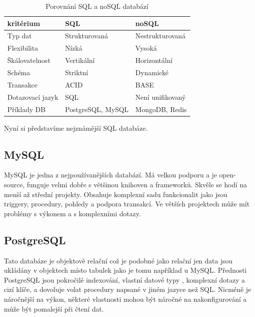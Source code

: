\begin{table}
    \centering
    \begin{tabular}{|l|l|l|}
        \hline
        kritérium        & SQL               & noSQL            \\
        \hline
        Typ dat          & Strukturovaná     & Nestrukturovaná  \\
        Flexibilita      & Nízká             & Vysoká           \\
        Škálovatelnost   & Vertikální        & Horizontální     \\
        Schéma           & Striktní          & Dynamické        \\
        Transakce        & ACID              & BASE             \\
        Dotazovací jazyk & SQL               & Není unifikovaný \\
        Příklady DB      & PostgreSQL, MySQL & MongoDB, Redis   \\
    \end{tabular}
    \caption{Porovnání SQL a noSQL databází}\label{tab:sql_vs_nosql}
\end{table}

Nyní si představíme nejznámější SQL databáze.

\subsection{MySQL}\label{sec:data_storage:mysql}
MySQL je jedna z nejpoužívanějších databází. Má velkou podporu a je open-source, funguje velmi dobře s většinou knihoven a frameworků. Skvěle se hodí na menší až střední projekty. Obsahuje komplexní sadu funkcionalit jako jsou triggery, procedury, pohledy a podpora transakcí. Ve větších projektech může mít problémy s výkonem  a s komplexními dotazy.\cite{guidetochoosingdatabase}\cite{howtochoosedatabase}


\subsection{PostgreSQL}\label{sec:data_storage:postgresql}
Tato databáze je objektově relační což je podobné jako relační jen data jsou ukládány v objektech místo tabulek jako je tomu například u MySQL. Přednosti PostgreSQL jsou pokročilé indexování, vlastní datové typy , komplexní dotazy a cizí klíče, a dovoluje volat procedury napsané v jiném jazyce než SQL. Nicméně je náročnější na výkon, některé vlastnosti mohou být náročné na nakonfigurování a může být pomalejší při čtení dat.\cite{guidetochoosingdatabase}\cite{howtochoosedatabase}

